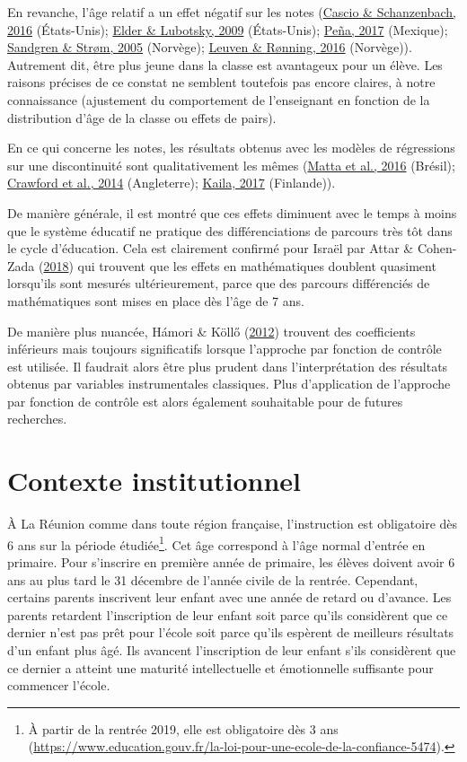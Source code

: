\documentclass[
]{book}
\begin{document}
En revanche, l'âge relatif a un effet négatif sur les notes (\protect\hyperlink{ref-CAS:SCH:16}{Cascio \& Schanzenbach, 2016} (États-Unis); \protect\hyperlink{ref-ELD:LUB:09}{Elder \& Lubotsky, 2009} (États-Unis); \protect\hyperlink{ref-PEN:17}{Peña, 2017} (Mexique); \protect\hyperlink{ref-SAN:STO:05}{Sandgren \& Strøm, 2005} (Norvège); \protect\hyperlink{ref-LEU:RON:11}{Leuven \& Rønning, 2016} (Norvège)). Autrement dit, être plus jeune dans la classe est avantageux pour un élève. Les raisons précises de ce constat ne semblent toutefois pas encore claires, à notre connaissance (ajustement du comportement de l'enseignant en fonction de la distribution d'âge de la classe ou effets de pairs).

\quad En ce qui concerne les notes, les résultats obtenus avec les modèles de régressions sur une discontinuité sont qualitativement les mêmes (\protect\hyperlink{ref-MAT:eal:16}{Matta et al., 2016} (Brésil); \protect\hyperlink{ref-CRA:eal:14}{Crawford et al., 2014} (Angleterre); \protect\hyperlink{ref-KAI:17}{Kaila, 2017} (Finlande)).

\quad De manière générale, il est montré que ces effets diminuent avec le temps à moins que le système éducatif ne pratique des différenciations de parcours très tôt dans le cycle d'éducation. Cela est clairement confirmé pour Israël par Attar \& Cohen-Zada (\protect\hyperlink{ref-ATT:COH:18}{2018}) qui trouvent que les effets en mathématiques doublent quasiment lorsqu'ils sont mesurés ultérieurement, parce que des parcours différenciés de mathématiques sont mises en place dès l'âge de 7 ans.

\quad De manière plus nuancée, Hámori \& Köllő (\protect\hyperlink{ref-HAM:KOL:12}{2012}) trouvent des coefficients inférieurs mais toujours significatifs lorsque l'approche par fonction de contrôle est utilisée. Il faudrait alors être plus prudent dans l'interprétation des résultats obtenus par variables instrumentales classiques. Plus d'application de l'approche par fonction de contrôle est alors également souhaitable pour de futures recherches.

\hypertarget{ageinst}{%
\section{Contexte institutionnel}\label{ageinst}}

À La Réunion comme dans toute région française, l'instruction est obligatoire dès 6 ans sur la période étudiée\footnote{À partir de la rentrée 2019, elle est obligatoire dès 3 ans (\url{https://www.education.gouv.fr/la-loi-pour-une-ecole-de-la-confiance-5474}).}. Cet âge correspond à l'âge normal d'entrée en primaire. Pour s'inscrire en première année de primaire, les élèves doivent avoir 6 ans au plus tard le 31 décembre de l'année civile de la rentrée. Cependant, certains parents inscrivent leur enfant avec une année de retard ou d'avance. Les parents retardent l'inscription de leur enfant soit parce qu'ils considèrent que ce dernier n'est pas prêt pour l'école soit parce qu'ils espèrent de meilleurs résultats d'un enfant plus âgé. Ils avancent l'inscription de leur enfant s'ils considèrent que ce dernier a atteint une maturité intellectuelle et émotionnelle suffisante pour commencer l'école.
\end{document}
